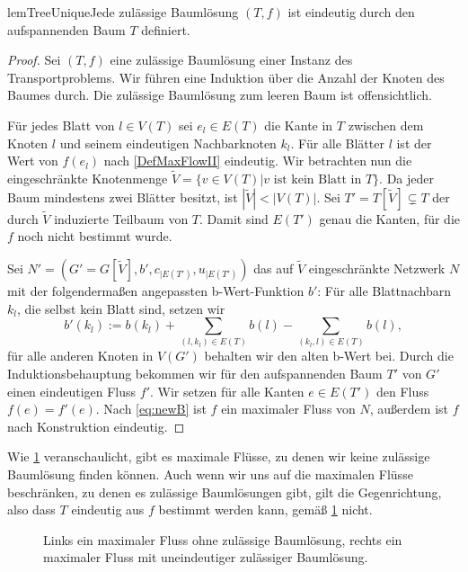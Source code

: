 \vspace{-1.9ex}
\begin{restatable}{lem}{TreeUnique}\label{TreeUnique}Jede zulässige Baumlösung $(T,f)$ ist eindeutig durch den aufspannenden Baum $T$ definiert.\end{restatable}
\begin{proof}Sei $(T,f)$ eine zulässige Baumlösung einer Instanz des Transportproblems. Wir führen eine Induktion über die Anzahl der Knoten des Baumes durch. Die zulässige Baumlösung zum leeren Baum ist offensichtlich.

Für jedes Blatt von $l\in V(T)$ sei $e_l\in E(T)$ die Kante in $T$ zwischen dem Knoten $l$ und seinem eindeutigen Nachbarknoten $k_l$. Für alle Blätter $l$ ist der Wert von $f(e_l)$ nach \cref{DefMaxFlowII} eindeutig. Wir betrachten nun die eingeschränkte Knotenmenge $\tilde{V}=\{v\in V(T)|v\text{ ist kein Blatt in }T\}$. Da jeder Baum mindestens zwei Blätter besitzt, ist $|\tilde{V}|<|V(T)|$. Sei $T'=T[\tilde{V}]\subsetneq T$ der durch $\tilde{V}$ induzierte Teilbaum von $T$. Damit sind $E(T')$ genau die Kanten, für die $f$ noch nicht bestimmt wurde.

Sei $N'=(G'=G[\tilde{V}],b',c_{|E(T')},u_{|E(T')})$ das auf $\tilde{V}$ eingeschränkte Netzwerk $N$ mit der folgendermaßen angepassten b-Wert-Funktion $b'$: Für alle Blattnachbarn $k_l$, die selbst kein Blatt sind, setzen wir
\begin{equation}\label{eq:newB}
b'(k_l):=b(k_l)+\sum_{(l,k_l)\in E(T)} b(l)-\sum_{(k_l,l)\in E(T)} b(l),\end{equation}
für alle anderen Knoten in $V(G')$ behalten wir den alten b-Wert bei. Durch die Induktionsbehauptung bekommen wir für den aufspannenden Baum $T'$ von $G'$ einen eindeutigen Fluss $f'$. Wir setzen für alle Kanten $e\in E(T')$ den Fluss $f(e)=f'(e)$. Nach \cref{eq:newB} ist $f$ ein maximaler Fluss von $N$, außerdem ist $f$ nach Konstruktion eindeutig.\end{proof}

Wie \cref{fig:BL} veranschaulicht, gibt es maximale Flüsse, zu denen wir keine zulässige Baumlösung finden können. Auch wenn wir uns auf die maximalen Flüsse beschränken, zu denen es zulässige Baumlösungen gibt, gilt die Gegenrichtung, also dass $T$ eindeutig aus $f$ bestimmt werden kann, gemäß \cref{fig:BL} nicht.

\begin{figure}[!ht]\centering

\caption{Links ein maximaler Fluss ohne zulässige Baumlösung, rechts ein maximaler Fluss mit uneindeutiger zulässiger Baumlösung.}
\label{fig:BL}
\end{figure}	

